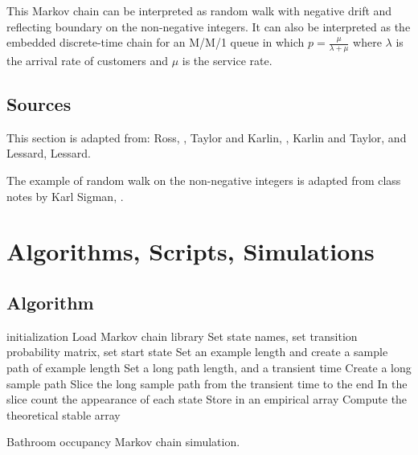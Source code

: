 \documentclass[12pt]{article}
\begin{document}
This Markov chain can be interpreted as random walk with negative
drift and reflecting boundary on the
non-negative integers.  It can also be interpreted as the embedded
discrete-time chain for an M/M/1 queue in which \( p =
\frac{\mu}{\lambda + \mu} \) where  \( \lambda \) is the arrival rate of
customers and \( \mu \) is the service rate.

\subsection*{Sources}

This section is adapted from:  Ross, , Taylor and Karlin, , Karlin and Taylor,  and Lessard, 
{Lessard}.

The example of random walk on the non-negative integers is adapted
from class notes by Karl Sigman,
.

\nocite{ross97}
\nocite{taylor98-introd-stoch-model}
\nocite{karlin81-secon-cours-stoch-proces}

\hr

\section*{Algorithms, Scripts, Simulations}

\subsection*{Algorithm}

\begin{algorithm}[H]
  \SetAlgoLined

  initialization\;
  Load Markov chain library\;
  Set state names, set transition probability matrix, set start
  state\;
  Set an example length and create a sample path of example length\;
  Set a long path length, and a transient time\;
  Create a long sample path\;
  Slice the long sample path from the transient time to the end\;
  In the slice count the appearance of each state\;
  Store in an empirical array\;
  Compute the theoretical stable array\;

  \caption{Bathroom occupancy Markov chain simulation.}
\end{algorithm}
  
\end{document}
